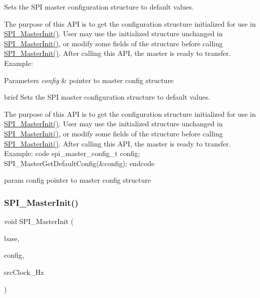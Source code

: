 Sets the S\+PI master configuration structure to default values. 

The purpose of this A\+PI is to get the configuration structure initialized for use in \mbox{\hyperlink{group__spi__driver_ga3fe5b421b088cc98222b8a214069574b}{S\+P\+I\+\_\+\+Master\+Init()}}. User may use the initialized structure unchanged in \mbox{\hyperlink{group__spi__driver_ga3fe5b421b088cc98222b8a214069574b}{S\+P\+I\+\_\+\+Master\+Init()}}, or modify some fields of the structure before calling \mbox{\hyperlink{group__spi__driver_ga3fe5b421b088cc98222b8a214069574b}{S\+P\+I\+\_\+\+Master\+Init()}}. After calling this A\+PI, the master is ready to transfer. Example\+: 
\begin{DoxyCode}{0}
\end{DoxyCode}



\begin{DoxyParams}{Parameters}
{\em config} & pointer to master config structure\\
\hline
\end{DoxyParams}
brief Sets the S\+PI master configuration structure to default values.

The purpose of this A\+PI is to get the configuration structure initialized for use in \mbox{\hyperlink{group__spi__driver_ga3fe5b421b088cc98222b8a214069574b}{S\+P\+I\+\_\+\+Master\+Init()}}. User may use the initialized structure unchanged in \mbox{\hyperlink{group__spi__driver_ga3fe5b421b088cc98222b8a214069574b}{S\+P\+I\+\_\+\+Master\+Init()}}, or modify some fields of the structure before calling \mbox{\hyperlink{group__spi__driver_ga3fe5b421b088cc98222b8a214069574b}{S\+P\+I\+\_\+\+Master\+Init()}}. After calling this A\+PI, the master is ready to transfer. Example\+: code spi\+\_\+master\+\_\+config\+\_\+t config; S\+P\+I\+\_\+\+Master\+Get\+Default\+Config(\&config); endcode

param config pointer to master config structure \mbox{\label{group__spi__driver_ga3fe5b421b088cc98222b8a214069574b}} 
\subsubsection{\texorpdfstring{SPI\_MasterInit()}{SPI\_MasterInit()}}
{\footnotesize\ttfamily void S\+P\+I\+\_\+\+Master\+Init (\begin{DoxyParamCaption}\item[{\mbox{\hyperlink{struct_s_p_i___type}{S\+P\+I\+\_\+\+Type}} $\ast$}]{base,  }\item[{const \mbox{\hyperlink{group__spi__driver_ga15e5f834f83ba89de1e920bba9d00394}{spi\+\_\+master\+\_\+config\+\_\+t}} $\ast$}]{config,  }\item[{uint32\+\_\+t}]{src\+Clock\+\_\+\+Hz }\end{DoxyParamCaption})}



